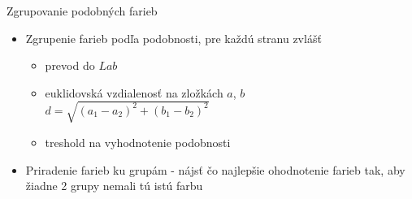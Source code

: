 \documentclass[red]{beamer}
\begin{document}
\begin{frame}{Zgrupovanie podobných farieb}
\begin{itemize}

\begin{textblock*}{2.3cm}(9.3cm,3.6cm)
\end{textblock*}

\item<1->Zgrupenie farieb podľa podobnosti, pre každú stranu zvlášť
    \begin{itemize}
    \item<2-> prevod do $Lab$
    \item<3-> euklidovská vzdialenosť na zložkách $a$, $b$\\
    $ d = \sqrt{(a_1-a_2)^2+(b_1-b_2)^2} $
    \item<4-> treshold na vyhodnotenie podobnosti
    \end{itemize}
\bigskip
\item<5-> Priradenie farieb ku grupám - nájsť čo najlepšie ohodnotenie farieb tak, aby žiadne 2 grupy nemali tú istú farbu
\end{itemize}
\end{frame}
\end{document}
